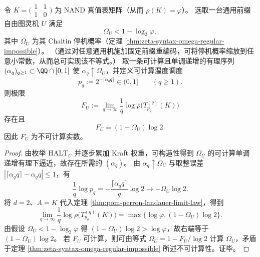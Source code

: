 \begin{corollary}[可计算温度调度产生不可计算自由能常数]\label{cor:conclusion-temperature-kernel-free-energy-omega-uncomputable}
令 \(K=\bigl(\begin{smallmatrix}1&1\\[2pt]1&0\end{smallmatrix}\bigr)\) 为 NAND 真值表矩阵（从而 \(\rho(K)=\varphi\)）。
选取一台通用前缀自由图灵机 \(U\) 满足
\[
\Omega_U<1-\log_2\varphi,
\]
其中 \(\Omega_U\) 为其 Chaitin 停机概率（定理 \ref{thm:zeta-syntax-omega-regular-impossible}）。
（通过对任意通用机施加固定前缀重编码，可将停机概率缩放到任意小常数，从而总可实现该不等式。）
取一条可计算且单调递增的有理序列 \((\alpha_q)_{q\ge 1}\subset\QQ\cap[0,1]\) 使 \(\alpha_q\uparrow\Omega_U\)，并定义可计算温度调度
\[
p_q:=2^{-\lceil \alpha_q q\rceil}\in(0,1]\qquad(q\ge 1).
\]
则极限
\[
F_U:=\lim_{q\to\infty}\frac1q\log\rho\!\bigl(T^{(q)}_{p_q}(K)\bigr)
\]
存在且
\[
F_U=(1-\Omega_U)\log 2.
\]
因此 \(F_U\) 为不可计算实数。
\end{corollary}
\begin{proof}
由枚举 \(\mathrm{HALT}_U\) 并逐步累加 Kraft 权重，可构造性得到 \(\Omega_U\) 的可计算单调递增有理下逼近，故存在所需的 \((\alpha_q)\)。
由 \(\alpha_q\uparrow\Omega_U\) 与取整误差 \(|\lceil \alpha_q q\rceil-\alpha_q q|\le 1\)，有
\[
\frac1q\log p_q
=-\frac{\lceil \alpha_q q\rceil}{q}\log 2
\longrightarrow
-\Omega_U\log 2.
\]
将 \(d=2\)、\(A=K\) 代入定理 \ref{thm:pom-perron-landauer-limit-law}，得到
\[
\lim_{q\to\infty}\frac1q\log\rho\!\bigl(T^{(q)}_{p_q}(K)\bigr)
=\max\{\log\varphi,(1-\Omega_U)\log 2\}.
\]
由假设 \(\Omega_U<1-\log_2\varphi\) 得 \((1-\Omega_U)\log 2>\log\varphi\)，故右端等于 \((1-\Omega_U)\log 2\)。
若 \(F_U\) 可计算，则可由等式 \(\Omega_U=1-F_U/\log 2\) 计算 \(\Omega_U\)，矛盾于定理 \ref{thm:zeta-syntax-omega-regular-impossible} 所述不可计算性。证毕。
\end{proof}

